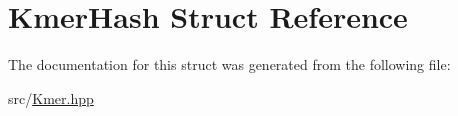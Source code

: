 \hypertarget{structKmerHash}{}\section{Kmer\+Hash Struct Reference}
\label{structKmerHash}


The documentation for this struct was generated from the following file\+:\begin{DoxyCompactItemize}
\item 
src/\hyperlink{Kmer_8hpp}{Kmer.\+hpp}\end{DoxyCompactItemize}
